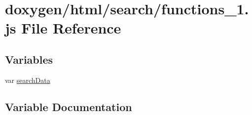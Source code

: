 \hypertarget{a00084}{}\section{doxygen/html/search/functions\+\_\+1.js File Reference}
\label{a00084}
\subsection*{Variables}
\begin{DoxyCompactItemize}
\item 
var \hyperlink{a00084_ad01a7523f103d6242ef9b0451861231e}{search\+Data}
\end{DoxyCompactItemize}


\subsection{Variable Documentation}
\hypertarget{a00084_ad01a7523f103d6242ef9b0451861231e}{}
